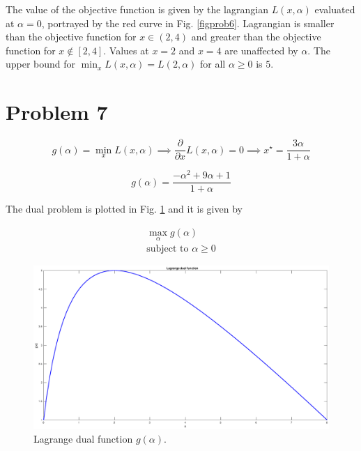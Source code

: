 \documentclass[12pt]{article}
\begin{document}
The value of the objective function is given by the lagrangian $L(x, \alpha)$ evaluated at $\alpha = 0$, portrayed by the red curve in Fig. \ref{figprob6}. Lagrangian is smaller than the objective function for $x \in (2, 4)$ and greater than the objective function for $x \notin [2, 4]$. Values at $x = 2$ and $x = 4$ are unaffected by $\alpha$. The upper bound for $\min_x L(x, \alpha) = L(2, \alpha)$ for all $\alpha \geq 0$ is $5$.

\section*{Problem 7}

\begin{equation}
 g(\alpha) = \min_x L(x, \alpha) \implies \frac{\partial}{\partial x} L(x, \alpha) = 0 \implies x^\star = \frac{3 \alpha}{1 + \alpha}
\end{equation}

\begin{equation}
 g(\alpha) = \frac{- \alpha^2 + 9 \alpha + 1}{1 + \alpha}
\end{equation}

The dual problem is plotted in Fig. \ref{fig:dual} and it is given by

\begin{equation}
 \begin{align}
  \max_\alpha g(\alpha) \\
  \text{subject to } \alpha \geq 0
 \end{align}
\end{equation}


\begin{figure}[!ht] 
 \center
 \includegraphics[width=\textwidth]{prob7}
 \caption{Lagrange dual function $g(\alpha)$.}
 \label{fig:dual}
\end{figure}
\end{document}
